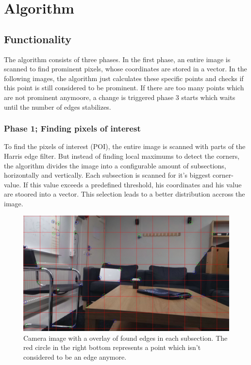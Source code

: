 \chapter{Algorithm }
\section{Functionality}
The algorithm consists of three phases. In the first phase, an entire image is scanned to find prominent pixels, whose coordinates are stored in a vector. In the following images, the algorithm just calculates these specific points and checks if this point is still considered to be prominent. If there are too many points which are not prominent anymoore, a change is triggered phase 3 starts which waits until the number of edges stabilizes. 

\subsection{Phase 1; Finding pixels of interest}
To find the pixels of interest (POI), the entire image is scanned with parts of the Harris edge filter.  But instead of finding local maximums to detect the corners, the algorithm divides the image into a configurable amount of subsections, horizontally and vertically. Each subsection is scanned for it's biggest corner-value. If this value exceeds a predefined threshold, his coordinates and his value are stoored into a vector. This selection leads to a better distribution accross the image. 

\begin{figure}[h!]
	\centering
	\includegraphics[width=0.9\linewidth]{bin/hotspots}
	\caption{Camera image with a overlay of found edges in each subsection. The red circle in the right bottom represents a point which isn't considered to be an edge anymore. }
	\label{fig:hotspots}
\end{figure} 


